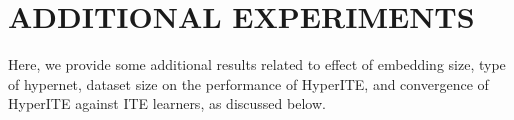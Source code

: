 \documentclass{article}
\begin{document}



\section{ADDITIONAL EXPERIMENTS}
\label{app_experiments}
Here, we provide some additional results related to effect of embedding size, type of hypernet, dataset size on the performance of HyperITE, and convergence of HyperITE against ITE learners, as discussed below.
\end{document}

